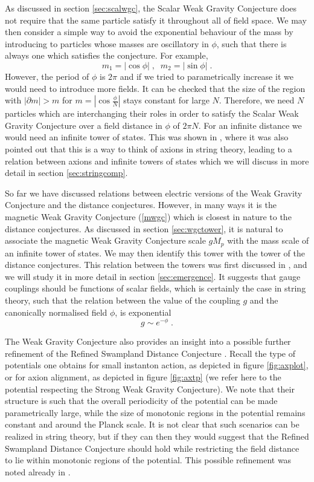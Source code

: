 \documentclass[11pt,a4paper]{article}
\numberwithin{equation}{section}
\numberwithin{table}{section}\setlength{\multlinegap}{25pt}
\newcommand{\be}{\begin{equation}}
\newcommand{\ee}{\end{equation}}
\begin{document}
As discussed in section \ref{sec:scalwgc}, the Scalar Weak Gravity Conjecture does not require that the same particle satisfy it throughout all of field space. We may then consider a simple way to avoid the exponential behaviour of the mass by introducing to particles whose masses are oscillatory in $\phi$, such that there is always one which satisfies the conjecture. For example,
\be
m_1 = \left|\cos  \phi \right| \;,\;\; m_2 = \left|\sin  \phi \right| \;. 
\ee
However, the period of $\phi$ is $2\pi$ and if we tried to parametrically increase it we would need to introduce more fields. It can be checked that the size of the region with $\left|\partial m\right| > m$ for $m = \left|\cos \frac{\phi}{N} \right|$ stays constant for large $N$. Therefore, we need $N$ particles which are interchanging their roles in order to satisfy the Scalar Weak Gravity Conjecture over a field distance in $\phi$ of $2 \pi N$. For an infinite distance we would need an infinite tower of states. This was shown in \cite{Palti:2017elp}, where it was also pointed out that this is a way to think of axions in string theory, leading to a relation between axions and infinite towers of states which we will discuss in more detail in section \ref{sec:stringcomp}. 

So far we have discussed relations between electric versions of the Weak Gravity Conjecture and the distance conjectures. However, in many ways it is the magnetic Weak Gravity Conjecture (\ref{mwgc}) which is closest in nature to the distance conjectures. As discussed in section \ref{sec:wgctower}, it is natural to associate the magnetic Weak Gravity Conjecture scale $g M_p$ with the mass scale of an infinite tower of states. We may then identify this tower with the tower of the distance conjectures. This relation between the towers was first discussed in \cite{Heidenreich:2016aqi,Klaewer:2016kiy}, and we will study it in more detail in section \ref{sec:emergence}. It suggests that gauge couplings should be functions of scalar fields, which is certainly the case in string theory, such that the relation between the value of the coupling $g$ and the canonically normalised field $\phi$, is exponential 
\be
\label{gep}
g \sim e^{-\phi} \;. 
\ee

The Weak Gravity Conjecture also provides an insight into a possible further refinement of the Refined Swampland Distance Conjecture \cite{Baume:2016psm}. Recall the type of potentials one obtains for small instanton action, as depicted in figure \ref{fig:axplot}, or for axion alignment, as depicted in figure \ref{fig:axtp} (we refer here to the potential respecting the Strong Weak Gravity Conjecture). We note that their structure is such that the overall periodicity of the potential can be made parametrically large, while the size of monotonic regions in the potential remains constant and around the Planck scale. It is not clear that such scenarios can be realized in string theory, but if they can then they would suggest that the Refined Swampland Distance Conjecture should hold while restricting the field distance to lie within monotonic regions of the potential. This possible refinement was noted already in \cite{Baume:2016psm}. 
\end{document}
